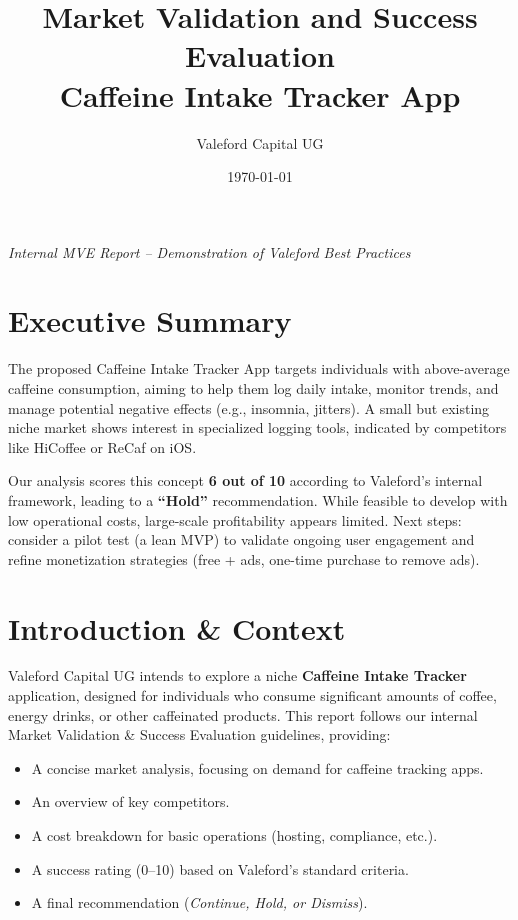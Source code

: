 \documentclass[12pt]{article}
\title{\textbf{Market Validation and Success Evaluation} \\ 
       \large Caffeine Intake Tracker App}
\author{Valeford Capital UG}
\date{\today}
\begin{document}
\maketitle

\vspace{1em}
\begin{center}
\textit{Internal MVE Report -- Demonstration of Valeford Best Practices}
\end{center}
\vspace{2em}

\tableofcontents
\newpage

\section*{Executive Summary}

The proposed Caffeine Intake Tracker App targets individuals with above-average 
caffeine consumption, aiming to help them log daily intake, monitor trends, 
and manage potential negative effects (e.g., insomnia, jitters). A small but 
existing niche market shows interest in specialized logging tools, indicated by 
competitors like HiCoffee or ReCaf on iOS. 

Our analysis scores this concept \textbf{6 out of 10} according to Valeford’s 
internal framework, leading to a \textbf{“Hold”} recommendation. While feasible 
to develop with low operational costs, large-scale profitability appears limited. 
Next steps: consider a pilot test (a lean MVP) to validate ongoing user engagement 
and refine monetization strategies (free + ads, one-time purchase to remove ads).

\newpage
\section{Introduction \& Context}
Valeford Capital UG intends to explore a niche \textbf{Caffeine Intake Tracker} 
application, designed for individuals who consume significant amounts of coffee, 
energy drinks, or other caffeinated products. This report follows our internal 
Market Validation \& Success Evaluation guidelines, providing:

\begin{itemize}[leftmargin=2em]
\item A concise market analysis, focusing on demand for caffeine tracking apps.
\item An overview of key competitors.
\item A cost breakdown for basic operations (hosting, compliance, etc.).
\item A success rating (0--10) based on Valeford’s standard criteria.
\item A final recommendation (\textit{Continue, Hold, or Dismiss}).
\end{itemize}
\end{document}
